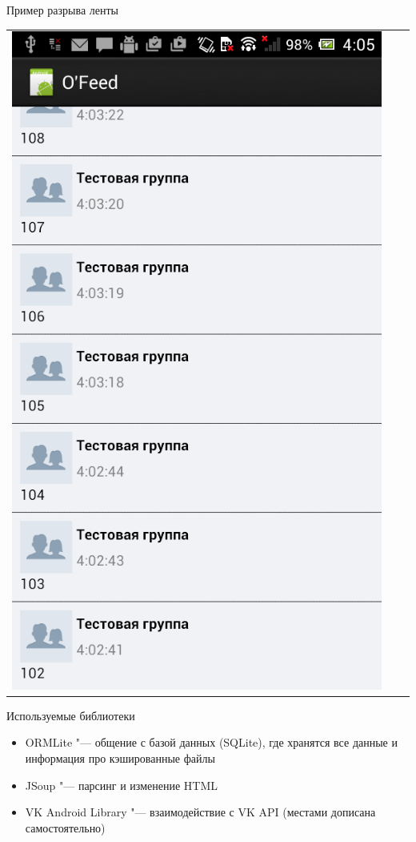 \documentclass[utf8,xcolor=table]{beamer}
\begin{document}
\begin{frame}[t]{Пример разрыва ленты}
\begin{center}
\begin{tabular}{ccc}
			\includegraphics[scale=0.18]{c.png}
		\end{tabular}
	\end{center}
\end{frame}

\begin{frame}[t]{Используемые библиотеки}
	\begin{itemize}
		\item ORMLite "--- общение с базой данных (SQLite), где хранятся все данные и информация про кэшированные файлы
		\item JSoup "--- парсинг и изменение HTML
		\item VK Android Library "--- взаимодействие с VK API (местами дописана самостоятельно)
	\end{itemize}
\end{frame}
\end{document}
